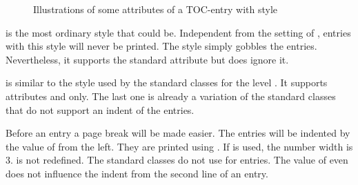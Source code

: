 \begin{description}
\begin{figure}
{%
    }
    \caption{Illustrations of some attributes of a TOC-entry with style 
      }
    \label{fig:tocbasic.dottedtocline}
  \end{figure}
\item[\PValue{gobble}] is the most ordinary style that could be. Independent
  from the setting of
  ,
  entries with this style will never be printed.  The style simply gobbles the
  entries. Nevertheless, it supports the standard attribute  but
  does ignore it.
\item[\PValue{largetocline}] is similar to the style used by the
  standard classes for the level . It supports attributes
   and  only. The last one is already a variation
  of the standard classes that do not support an indent of the 
  entries.

  Before an entry a page break will be made easier. The entries will be
  indented by the value of  from the left. They are printed
  using . If  is used, the
  number width is 3.  is not redefined. The
  standard classes do not use  for  entries. The
  value of  even does not influence the indent from the second
  line of an entry.


\end{description}
